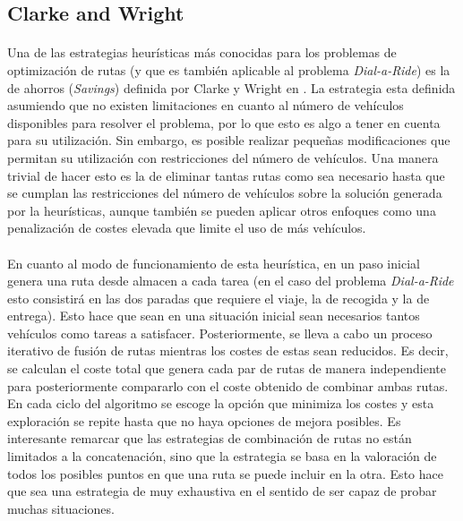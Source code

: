\documentclass{subfiles}
\begin{document}
      \subsection{Clarke and Wright}
      \label{sec:solving_clarke_and_wright}

        \paragraph{}
        Una de las estrategias heurísticas más conocidas para los problemas de optimización de rutas (y que es también aplicable al problema \emph{Dial-a-Ride}) es la de ahorros (\emph{Savings}) definida por Clarke y Wright en \cite{clarke1964scheduling}. La estrategia esta definida asumiendo que no existen limitaciones en cuanto al número de vehículos disponibles para resolver el problema, por lo que esto es algo a tener en cuenta para su utilización. Sin embargo, es posible realizar pequeñas modificaciones que permitan su utilización con restricciones del número de vehículos. Una manera trivial de hacer esto es la de eliminar tantas rutas como sea necesario hasta que se cumplan las restricciones del número de vehículos sobre la solución generada por la heurísticas, aunque también se pueden aplicar otros enfoques como una penalización de costes elevada que limite el uso de más vehículos.

        \paragraph{}
        En cuanto al modo de funcionamiento de esta heurística, en un paso inicial genera una ruta desde almacen a cada tarea (en el caso del problema \emph{Dial-a-Ride} esto consistirá en las dos paradas que requiere el viaje, la de recogida y la de entrega). Esto hace que sean en una situación inicial sean necesarios tantos vehículos como tareas a satisfacer. Posteriormente, se lleva a cabo un proceso iterativo de fusión de rutas mientras los costes de estas sean reducidos. Es decir, se calculan el coste total que genera cada par de rutas de manera independiente para posteriormente compararlo con el coste obtenido de combinar ambas rutas. En cada ciclo del algoritmo se escoge la opción que minimiza los costes y esta exploración se repite hasta que no haya opciones de mejora posibles. Es interesante remarcar que las estrategias de combinación de rutas no están limitados a la concatenación, sino que la estrategia se basa en la valoración de todos los posibles puntos en que una ruta se puede incluir en la otra. Esto hace que sea una estrategia de muy exhaustiva en el sentido de ser capaz de probar muchas situaciones.
\end{document}
